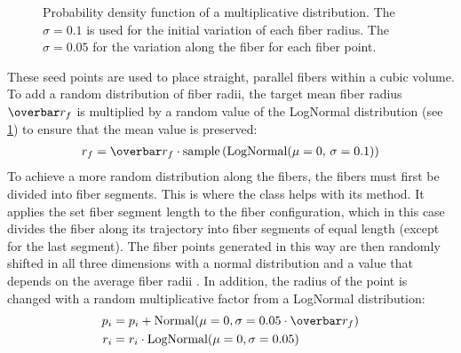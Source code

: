 \begin{figure}[!t]
\centering
\caption[]{Probability density function of a multiplicative  distribution. The $\sigma=0.1$ is used for the initial variation of each fiber radius. The $\sigma=0.05$ for the variation along the fiber for each fiber point.}
\label{fig:logNormal}
\end{figure}
%
These seed points are used to place straight, parallel fibers within a cubic volume.
To add a random distribution of fiber radii, the target mean fiber radius $\fiberRadiusMean$ is multiplied by a random value of the LogNormal distribution (see \cref{fig:logNormal}) to ensure that the mean value is preserved:
\begin{align}
\fiberRadius = \fiberRadiusMean \cdot \mathrm{sample}\left(\mathrm{LogNormal}(\mu=0, \, \sigma=0.1)\right)
\end{align}
%
To achieve a more random distribution along the fibers, the fibers must first be divided into fiber segments.
This is where the  class helps with its  method.
It applies the set fiber segment length to the fiber configuration, which in this case divides the fiber along its trajectory into fiber segments of equal length (except for the last segment).
The fiber points generated in this way are then randomly shifted in all three dimensions with a normal distribution and a value that depends on the average fiber radii \fiberRadiusMean{}.
In addition, the radius of the point is changed with a random multiplicative factor from a LogNormal distribution:
%
\begin{align}
\begin{split}
p_i &= p_i + \mathrm{Normal}(\mu=0,\sigma=0.05 \cdot \fiberRadiusMean)\\
r_i &= r_i \cdot \mathrm{LogNormal}(\mu=0,\sigma=0.05)
\end{split}
\end{align}
%
%
%
